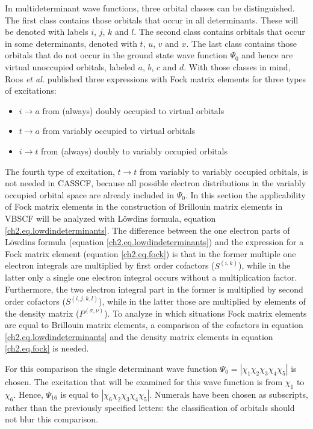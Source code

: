 In multideterminant wave functions, three orbital classes can be distinguished. The first class contains those orbitals that occur in all determinants. These will be denoted with labels $i$, $j$, $k$ and $l$. The second class contains orbitals that occur in some determinants, denoted with $t$, $u$, $v$ and $x$. The last class contains those orbitals that do not occur in the ground state wave function $\Psi_0$ and hence are virtual unoccupied orbitals, labeled $a$, $b$, $c$ and $d$. With those classes in mind, Roos \textit{et al.} published three expressions with Fock matrix elements for three types of excitations:
\begin{itemize}
\item{$i \rightarrow a$ from (always) doubly occupied to virtual orbitals}
\item{$t \rightarrow a$ from variably occupied to virtual orbitals}
\item{$i \rightarrow t$ from (always) doubly to variably occupied orbitals}
\end{itemize}
The fourth type of excitation, $t \rightarrow t$ from variably to variably occupied orbitals, is not needed in CASSCF, because all possible electron distributions in the variably occupied orbital space are already included in $\Psi_0$. In this section the applicability of Fock matrix elements in the construction of Brillouin matrix elements in VBSCF will be analyzed with L\"{o}wdins formula, equation \ref{ch2.eq.lowdindeterminants}. The difference between the one electron parts of L\"{o}wdins formula (equation \ref{ch2.eq.lowdindeterminants}) and the expression for a Fock matrix element (equation \ref{ch2.eq.fock}) is that in the former multiple one electron integrals are multiplied by first order cofactors ($S^{(i,k)}$), while in the latter only a single one electron integral occurs without a multiplication factor. Furthermore, the two electron integral part in the former is multiplied by second order cofactors ($S^{(i,j,k,l)}$), while in the latter those are multiplied by elements of the density matrix ($P^{(\sigma,\nu)}$). To analyze in which situations Fock matrix elements are equal to Brillouin matrix elements, a comparison of the cofactors in equation \ref{ch2.eq.lowdindeterminants} and the density matrix elements in equation \ref{ch2.eq.fock} is needed.

For this comparison the single determinant wave function $\Psi_0 = |\chi_1\chi_2\chi_3\chi_4\chi_5|$ is chosen. The excitation that will be examined for this wave function is from $\chi_1$ to $\chi_6$. Hence, $\Psi_{16}$ is equal to $|\chi_6\chi_2\chi_3\chi_4\chi_5|$. Numerals have been chosen as subscripts, rather than the previously specified letters: the classification of orbitals should not blur this comparison. 

